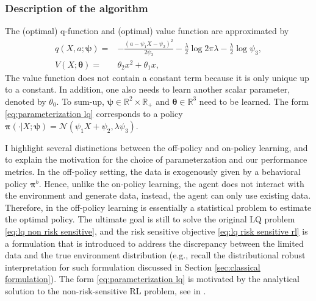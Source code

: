 \subsubsection{Description of the algorithm}
The (optimal) q-function and (optimal) value function are approximated by
\begin{equation}
	\label{eq:parameterization lq}
	\begin{aligned}
		q(X,a;\bm\psi) = & -\frac{\left( a - \psi_1 X - \psi_2  \right)^2}{2\psi_3} - \frac{\lambda}{2}\log2\pi\lambda - \frac{\lambda}{2}\log\psi_3, \\
		V(X;\bm\theta) = & \theta_2 x^2 + \theta_1 x ,
	\end{aligned}
\end{equation}
The value function does not contain a constant term because it is only unique up to a constant. In addition, one also needs to learn another scalar parameter, denoted by $\theta_0$. To sum-up, $\bm\psi\in \mathbb{R}^2\times \mathbb R_+$ and $\bm\theta\in \mathbb R^3$ need to be learned. The form \eqref{eq:parameterization lq} corresponds to a policy $\bm\pi(\cdot|X;\bm\psi) = \mathcal N(\psi_1 X + \psi_2,\lambda\psi_3)$. 

I highlight several distinctions between the off-policy and on-policy learning, and to explain the motivation for the choice of parameterzation and our performance metrics. In the off-policy setting, the data is exogenously given by a behavioral policy $\bm\pi^b$. Hence, unlike the on-policy learning, the agent does not interact with the environment and generate data, instead, the agent can only use existing data. Therefore, in the off-policy learning is essentially a statistical problem to estimate the optimal policy. The ultimate goal is still to solve the original LQ problem \eqref{eq:lq non risk sensitive}, and the risk sensitive objective \eqref{eq:lq risk sensitive rl} is a formulation that is introduced to address the discrepancy between the limited data and the true environment distribution (e.g., recall the distributional robust interpretation for such formulation discussed in Section \ref{sec:classical formulation}). The form \eqref{eq:parameterization lq} is motivated by the analytical solution to the non-risk-sensitive RL problem, see in \citet[Appendix B2]{jia2022policypg}.

